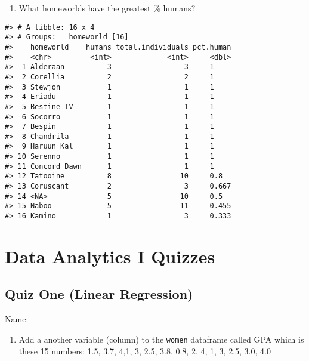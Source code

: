 \documentclass[
]{book}
\providecommand{\tightlist}{%
  \setlength{\itemsep}{0pt}\setlength{\parskip}{0pt}}
\begin{document}
\begin{enumerate}
\def\labelenumi{\arabic{enumi}.}
\setcounter{enumi}{6}
\tightlist
\item
  What homeworlds have the greatest \% humans?
\end{enumerate}

\begin{verbatim}
#> # A tibble: 16 x 4
#> # Groups:   homeworld [16]
#>    homeworld    humans total.individuals pct.human
#>    <chr>         <int>             <int>     <dbl>
#>  1 Alderaan          3                 3     1    
#>  2 Corellia          2                 2     1    
#>  3 Stewjon           1                 1     1    
#>  4 Eriadu            1                 1     1    
#>  5 Bestine IV        1                 1     1    
#>  6 Socorro           1                 1     1    
#>  7 Bespin            1                 1     1    
#>  8 Chandrila         1                 1     1    
#>  9 Haruun Kal        1                 1     1    
#> 10 Serenno           1                 1     1    
#> 11 Concord Dawn      1                 1     1    
#> 12 Tatooine          8                10     0.8  
#> 13 Coruscant         2                 3     0.667
#> 14 <NA>              5                10     0.5  
#> 15 Naboo             5                11     0.455
#> 16 Kamino            1                 3     0.333
\end{verbatim}

\hypertarget{data-analytics-i-quizzes}{%
\chapter{Data Analytics I Quizzes}\label{data-analytics-i-quizzes}}

\hypertarget{quiz-one-linear-regression}{%
\section{Quiz One (Linear Regression)}\label{quiz-one-linear-regression}}

Name: \_\_\_\_\_\_\_\_\_\_\_\_\_\_\_\_\_\_\_\_\_\_\_\_\_\_

\begin{enumerate}
\def\labelenumi{\arabic{enumi}.}
\tightlist
\item
  Add a another variable (column) to the \texttt{women} dataframe called GPA which is these 15 numbers: 1.5, 3.7, 4,1, 3, 2.5, 3.8, 0.8, 2, 4, 1, 3, 2.5, 3.0, 4.0
\end{enumerate}
\end{document}
